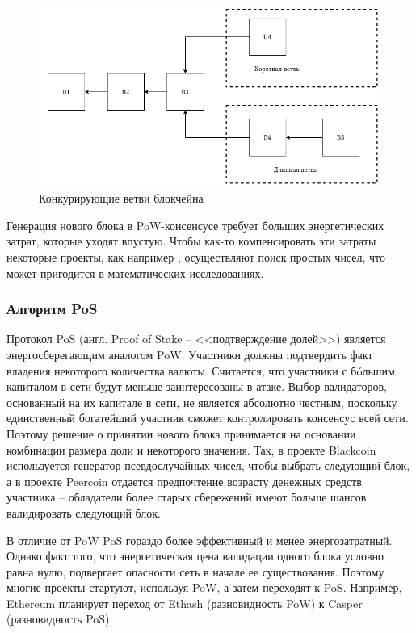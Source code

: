 \begin{figure}[hbtp]
	\centering
	\includegraphics[width=\textwidth]{img/pow.png}
	\caption{Конкурирующие ветви блокчейна}
	\label{fig:a1}
\end{figure}

Генерация нового блока в PoW-консенсусе требует больших энергетических затрат, которые уходят впустую. Чтобы как-то компенсировать эти затраты некоторые проекты, как например \cite{primecoin}, осуществляют поиск простых чисел, что может пригодится в математических исследованиях.



\subsubsection{Алгоритм PoS}

Протокол PoS (англ. Proof of Stake -- <<подтверждение долей>>) является энергосберегающим аналогом PoW. Участники должны подтвердить факт владения некоторого количества валюты. Считается, что участники с б\'oльшим капиталом в сети будут меньше заинтересованы в атаке. Выбор валидаторов, основанный на их капитале в сети, не является абсолютно честным, поскольку единственный богатейший участник сможет контролировать консенсус всей сети. Поэтому решение о принятии нового блока принимается на основании комбинации размера доли и некоторого значения. Так, в проекте Blackcoin \cite{blackcoin} используется генератор псевдослучайных чисел, чтобы выбрать следующий блок, а в проекте Peercoin \cite{peercoin} отдается предпочтение возрасту денежных средств участника -- обладатели более старых сбережений имеют больше шансов валидировать следующий блок.

В отличие от PoW PoS гораздо более эффективный и менее энергозатратный. Однако факт того, что энергетическая цена валидации одного блока условно равна нулю, подвергает опасности сеть в начале ее существования. Поэтому многие проекты стартуют, используя PoW, а затем переходят к PoS. Например, Ethereum \cite{evm} планирует переход от Ethash (разновидность PoW) к Casper (разновидность PoS).



